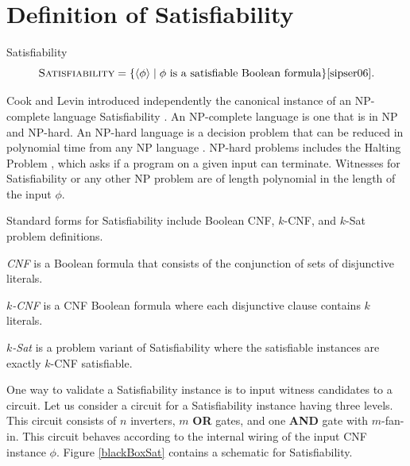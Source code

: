 \section{Definition of {\sc Satisfiability}}

	

\begin{definition}
{\sc Satisfiability}\\
\[
\text{\sc Satisfiability} = \{ \langle \phi \rangle \mid \phi \text{ is a satisfiable Boolean formula}\} \cite{sipser06}.
\]	
\end{definition}

Cook and Levin introduced independently the canonical instance of an \textsf{NP-complete} language {\sc Satisfiability} \cite{Cook:1971:CTP:800157.805047, levin1973}.  An \textsf{NP-complete} language is one that is in \textsf{NP} and \textsf{NP-hard}.  An \textsf{NP-hard} language is a decision problem that can be reduced in polynomial time from any \textsf{NP} language \cite{sipser06}.  \textsf{NP-hard} problems includes the {\sc Halting Problem} \cite{sipser06}, which asks if a program on a given input can terminate.  Witnesses for {\sc Satisfiability} or any other \textsf{NP} problem are of length polynomial in the length of the input $\phi$.

Standard forms for {\sc Satisfiability} include Boolean CNF, $k$-CNF, and $k$-{\sc Sat} problem definitions.

\begin{definition}
\emph{CNF} is a Boolean formula that consists of the conjunction of sets of disjunctive literals.
\end{definition}

\begin{definition}
\emph{$k$-CNF} is a CNF Boolean formula where each disjunctive clause contains $k$ literals.
\end{definition}

\begin{definition}
\emph{$k$-{\sc Sat}} is a problem variant of {\sc Satisfiability} where the satisfiable instances are exactly $k$-CNF satisfiable.
\end{definition}


One way to validate a {\sc Satisfiability} instance is to input witness candidates to a circuit.  Let us consider a circuit for a {\sc Satisfiability} instance having three levels.  This circuit consists of $n$ inverters, $m$ \textbf{OR} gates, and one \textbf{AND} gate with $m$-fan-in.  This circuit behaves according to the internal wiring of the input CNF instance $\phi$. Figure \ref{blackBoxSat} contains a schematic for {\sc Satisfiability}.	

